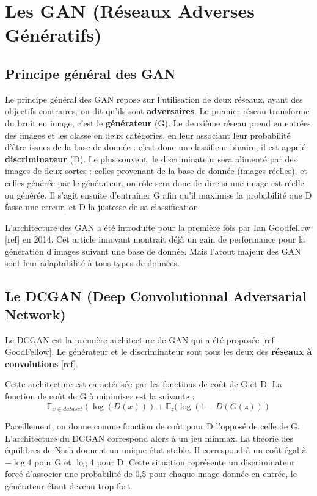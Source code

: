 \chapter{Les GAN (Réseaux Adverses Génératifs)}

\section{Principe général des GAN}
Le principe général des GAN repose sur l'utilisation de deux réseaux, ayant des objectifs contraires, on dit qu'ils sont \textbf{adversaires}. Le premier réseau transforme du bruit en image, c'est le \textbf{générateur} (G). Le deuxième réseau prend en entrées des images et les classe en deux catégories, en leur associant leur probabilité d'être issues de la base de donnée : c'est donc un classifieur binaire, il est appelé \textbf{discriminateur} (D). Le plus souvent, le discriminateur sera alimenté par des images de deux sortes : celles provenant de la base de donnée (images réelles), et celles générée par le générateur, on rôle sera donc de dire si une image est réelle ou générée. Il s'agit ensuite d'entraîner G afin qu'il maximise la probabilité que D fasse une erreur, et D la justesse de sa classification

L'architecture des GAN a été introduite pour la première fois par Ian Goodfellow [ref] en 2014. Cet article innovant montrait déjà un gain de performance pour la génération d'images suivant une base de donnée. Mais l'atout majeur des GAN sont leur adaptabilité à tous types de données.


\section{Le DCGAN (Deep Convolutionnal Adversarial Network)}
Le DCGAN est la première architecture de GAN qui a été proposée [ref GoodFellow]. Le générateur et le discriminateur sont tous les deux des \textbf{réseaux à convolutions} [ref].

Cette architecture est caractérisée par les fonctions de coût de G et D. La fonction de coût de G à minimiser est la suivante : \begin{equation}
   \mathbb{E}_{x \in dataset}(\log (D(x))) + \mathbb{E}_{z}(\log (1 - D(G(z)))
\end{equation}

Pareillement, on donne comme fonction de coût pour D l'opposé de celle de G. L'architecture du DCGAN correspond alors à un jeu minmax. La théorie des équilibres de Nash donnent un unique état stable. Il correspond à un coût égal à $-\log 4$ pour G et $ \log 4$ pour D. Cette situation représente un discriminateur forcé d'associer une probabilité de 0,5 pour chaque image donnée en entrée, le générateur étant devenu trop fort.

